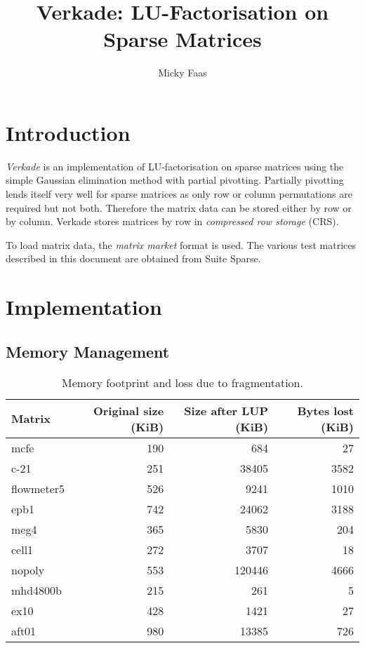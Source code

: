 \documentclass[10pt,a4paper]{article}
\author{Micky Faas}
\begin{document}
\title{Verkade: LU-Factorisation on Sparse Matrices}
\maketitle
\section{Introduction}
\emph{Verkade} is an implementation of LU-factorisation on sparse matrices using the simple Gaussian elimination method with partial pivotting. Partially pivotting lends itself very well for sparse matrices as only row or column permutations are required but not both. Therefore the matrix data can be stored either by row or by column. Verkade stores matrices by row in \emph{compressed row storage} (CRS)\cite{crs}.

To load matrix data, the \emph{matrix market} format\cite{mm} is used. The various test matrices described in this document are obtained from Suite Sparse\cite{suitesparse}.

\section{Implementation}

\subsection{Memory Management}

\begin{table}
\begin{tabular}{|l|rrr|}
\hline 
Matrix & Original size (KiB) & Size after LUP (KiB) & Bytes lost (KiB)\\ 
\hline 
mcfe & 190  & 684  & 27  \\
c-21 & 251  & 38405  & 3582  \\ 
flowmeter5 & 526  & 9241  & 1010  \\ 
epb1 & 742  & 24062  & 3188  \\ 
meg4 & 365  & 5830  & 204  \\ 
cell1 & 272  & 3707  & 18  \\ 
nopoly & 553  & 120446  & 4666  \\ 
mhd4800b & 215  & 261  & 5  \\ 
ex10 & 428  & 1421  & 27  \\ 
aft01 & 980  & 13385  & 726  \\ 
\hline 
\end{tabular} 
\label{mem}
\caption{Memory footprint and loss due to fragmentation.}
\end{table}
\end{document}
